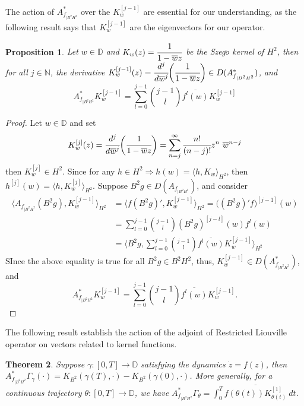 \documentclass[preprint,12pt]{elsarticle} %
\theoremstyle{plain}
\newtheorem{theorem}{Theorem}[section]
\newtheorem{proposition}[theorem]{Proposition}
\theoremstyle{definition}
\theoremstyle{remark}
\begin{document}
The action of $A_{f_{|B^2 H^2}}^{*}$ over the $K_{w}^{[j-1]}$ are essential for our understanding, as the following result says that $K_{w}^{[j-1]}$ are the eigenvectors for our operator.
\begin{proposition}\label{pro 4.2}
    Let $w\in \mathbb{D}$ and $K_w(z)=\cfrac{1}{1-\overline{w}z}$ be the Szeg$\ddot{o}$ kernel of $H^2$, then for all $j\in \mathbb{N}$, the derivative $K_{w}^{[j-1]}(z)=\cfrac{d^j}{d\overline{w}^j}\bigg(\cfrac{1}{1-\overline{w}z}\bigg)\in D(A_{f_{|B^2 H^2}}^{*})$, and $$A_{f_{|B^2 H^2}}^{*}K_{w}^{[j-1]}=\sum_{l=0}^{j-1}\binom{j-1}{l}\overline{f^l (w)}K_{w}^{[j-1]}  $$
\end{proposition}
\begin{proof}
  Let $w\in \mathbb{D}$ and set
  $$
K_{w}^{[j]}(z)=\cfrac{d^j}{d\overline{w}^j}\bigg(\cfrac{1}{1-\overline{w}z}\bigg)=\sum_{n=j}^{\infty}\cfrac{n!}{(n-j)!}z^n~ \overline{w}^{n-j}
  $$
  then $K_{w}^{[j]}\in H^2$. Since for any $h\in H^2\Rightarrow h(w)=\langle h, K_w\rangle_{H^2}$, then $h^{[j]}(w)=\langle h, K_{w}^{[j]}\rangle_{H^2}$. Suppose $B^2g\in D(A_{f_{|B^2 H^2}})$, and consider
  \begin{align*}
      \langle A_{f_{|B^2 H^2}} (B^2 g),K_{w}^{[j-1]}\rangle_{H^2} &= \langle f (B^2 g)',K_{w}^{[j-1]}\rangle_{H^2} =\big((B^2g)'f\big)^{[j-1]}(w)\\
      &= \sum_{l=0}^{j-1}\binom{j-1}{l}(B^2g)^{[j-l]} (w)f^{l}(w)\\
      &= \langle B^2g, \sum_{l=0}^{j-1}\binom{j-1}{l}\overline{f^l (w)}K_{w}^{[j-1]}\rangle_{H^2}
  \end{align*}
SInce the above equality is true for all $B^2g\in B^2H^2$,  thus, $K_{w}^{[j-1]}\in D(A_{f_{|B^2 H^2}}^{*})$, and $$A_{f_{|B^2 H^2}}^{*}K_{w}^{[j-1]}=\sum_{l=0}^{j-1}\binom{j-1}{l}\overline{f^l (w)}K_{w}^{[j-1]}.  $$

\end{proof}

 The following result establish the action of the adjoint of Restricted Liouville operator on vectors related to kernel functions. 
\begin{theorem} \label{Thm 4.3}
    Suppose $\gamma:[0,T]\rightarrow \mathbb{D}$ satisfying the dynamics $\dot{z}=f(z)$, then $A_{f_{|B^2 H^2}}^{*}\Gamma_{\gamma}(\cdot)=K_{B^2}(\gamma(T),\cdot)-K_{B^2}(\gamma(0),\cdot)$. More generally, for a continuous trajectory $\theta:[0,T]\rightarrow \mathbb{D}$, we have $ A_{f_{|B^2 H^2}}^{*}\Gamma_{\theta}= \int_{0}^{T}\overline{f(\theta(t))K_{\theta(t)}^{[1]}}~dt$.
\end{theorem}
\end{document}
